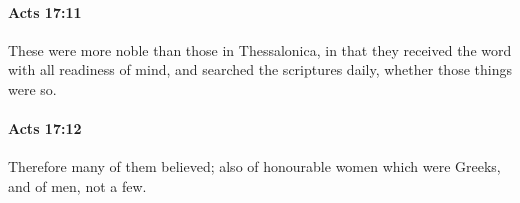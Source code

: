 		\paragraph{Acts 17:11} %
			\label{ACTS-17-11}

			These were more noble than those in Thessalonica, in that they received the word with all readiness of mind, and searched the scriptures daily, whether those things were so.

			\begin{framed}
			\scriptsize
				\begin{compactdesc}
					\item[SBLG] 
				\end{compactdesc}
			\end{framed}

		\paragraph{Acts 17:12} %
			\label{ACTS-17-12}

			Therefore many of them believed; also of honourable women which were Greeks, and of men, not a few.


